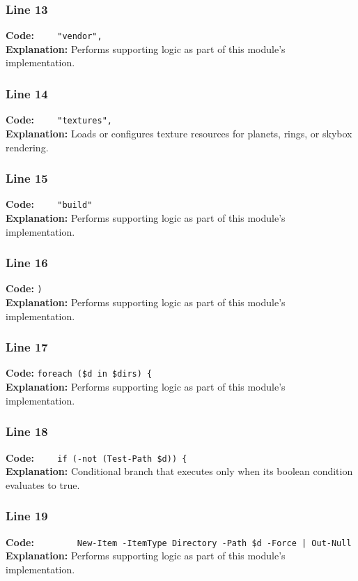 \documentclass[11pt,a4paper]{article}
\begin{document}
\subsubsection*{Line 13}
\textbf{Code:} \verb|    "vendor",|\\
\textbf{Explanation:} Performs supporting logic as part of this module's implementation.

\subsubsection*{Line 14}
\textbf{Code:} \verb|    "textures",|\\
\textbf{Explanation:} Loads or configures texture resources for planets, rings, or skybox rendering.

\subsubsection*{Line 15}
\textbf{Code:} \verb|    "build"|\\
\textbf{Explanation:} Performs supporting logic as part of this module's implementation.

\subsubsection*{Line 16}
\textbf{Code:} \verb|)|\\
\textbf{Explanation:} Performs supporting logic as part of this module's implementation.

\subsubsection*{Line 17}
\textbf{Code:} \verb|foreach ($d in $dirs) {|\\
\textbf{Explanation:} Performs supporting logic as part of this module's implementation.

\subsubsection*{Line 18}
\textbf{Code:} \verb|    if (-not (Test-Path $d)) {|\\
\textbf{Explanation:} Conditional branch that executes only when its boolean condition evaluates to true.

\subsubsection*{Line 19}
\textbf{Code:} \verb!        New-Item -ItemType Directory -Path $d -Force | Out-Null!\\
\textbf{Explanation:} Performs supporting logic as part of this module's implementation.
\end{document}
